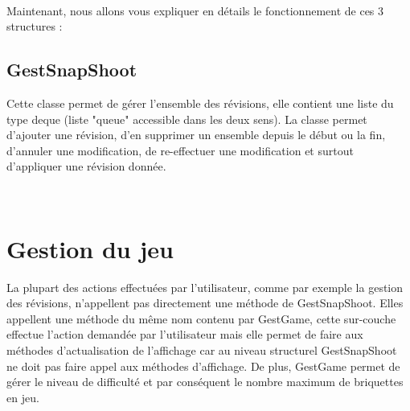 \documentclass[frenchb,twoside]{EPURapport}
\begin{document}
		\
		
		Maintenant, nous allons vous expliquer en détails le fonctionnement de
		ces 3 structures :
		
			\subsection{GestSnapShoot}
			Cette classe permet de gérer l'ensemble des révisions, elle contient
			une liste du type deque (liste "queue" accessible dans les deux sens).
			La classe permet d'ajouter une révision, d'en supprimer un ensemble depuis
			le début ou la fin, d'annuler une modification, de re-effectuer une modification
			 et surtout d'appliquer une révision donnée.
			 
			 \
			 
        

    \section{Gestion du jeu}
    
		La plupart des actions effectuées par l'utilisateur, comme par exemple la gestion
		des révisions, n'appellent pas directement une méthode de GestSnapShoot. Elles appellent
		une méthode du même nom contenu par GestGame, cette sur-couche effectue l'action demandée
		par l'utilisateur mais elle permet de faire aux méthodes d'actualisation de l'affichage
		car au niveau structurel GestSnapShoot ne doit pas faire appel aux méthodes d'affichage.
		De plus, GestGame permet de gérer le niveau de difficulté et par conséquent le nombre maximum
		de briquettes en jeu.
\end{document}
